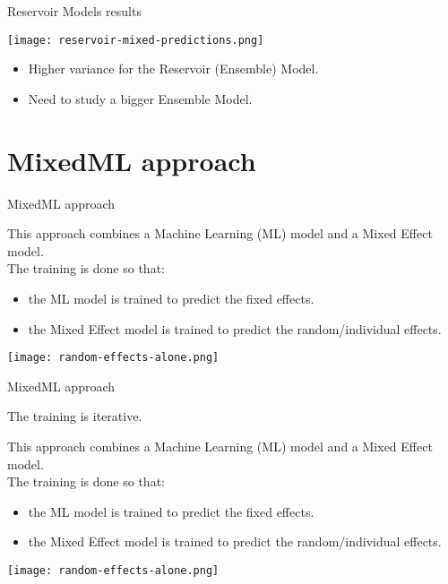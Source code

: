 \documentclass{beamer}
\begin{document}
\begin{frame}{Reservoir Models results}



\centering
\texttt{[image: reservoir-mixed-predictions.png]}

\begin{itemize}
\item Higher variance for the Reservoir (Ensemble) Model.
\item Need to study a bigger Ensemble Model.
\end{itemize}

\end{frame}



\section{MixedML approach}


\begin{frame}{MixedML approach}


This approach combines a Machine Learning (ML) model and a Mixed Effect model.\\
\medskip
The training is done so that:
\begin{itemize}
\item the ML model is trained to predict the fixed effects.
\item the Mixed Effect model is trained to predict the random/individual effects.
\end{itemize}

\begin{flushright}
\texttt{[image: random-effects-alone.png]}
\end{flushright}

\end{frame}


\begin{frame}{MixedML approach}


The training is iterative.


This approach combines a Machine Learning (ML) model and a Mixed Effect model.\\
\medskip
The training is done so that:
\begin{itemize}
\item the ML model is trained to predict the fixed effects.
\item the Mixed Effect model is trained to predict the random/individual effects.
\end{itemize}

\begin{flushright}
\texttt{[image: random-effects-alone.png]}
\end{flushright}

\end{frame}
\end{document}
